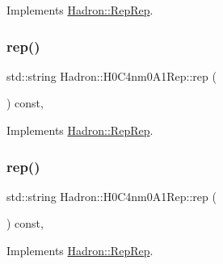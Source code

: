 Implements \mbox{\hyperlink{structHadron_1_1RepRep_ab3213025f6de249f7095892109575fde}{Hadron\+::\+Rep\+Rep}}.

\mbox{\label{structHadron_1_1H0C4nm0A1Rep_a30712f6aadf0e0304142526d08c2822e}} 
\subsubsection{\texorpdfstring{rep()}{rep()}\hspace{0.1cm}{\footnotesize\ttfamily [2/5]}}
{\footnotesize\ttfamily std\+::string Hadron\+::\+H0\+C4nm0\+A1\+Rep\+::rep (\begin{DoxyParamCaption}{ }\end{DoxyParamCaption}) const\hspace{0.3cm}{\ttfamily [inline]}, {\ttfamily [virtual]}}



Implements \mbox{\hyperlink{structHadron_1_1RepRep_ab3213025f6de249f7095892109575fde}{Hadron\+::\+Rep\+Rep}}.

\mbox{\label{structHadron_1_1H0C4nm0A1Rep_a30712f6aadf0e0304142526d08c2822e}} 
\subsubsection{\texorpdfstring{rep()}{rep()}\hspace{0.1cm}{\footnotesize\ttfamily [3/5]}}
{\footnotesize\ttfamily std\+::string Hadron\+::\+H0\+C4nm0\+A1\+Rep\+::rep (\begin{DoxyParamCaption}{ }\end{DoxyParamCaption}) const\hspace{0.3cm}{\ttfamily [inline]}, {\ttfamily [virtual]}}



Implements \mbox{\hyperlink{structHadron_1_1RepRep_ab3213025f6de249f7095892109575fde}{Hadron\+::\+Rep\+Rep}}.

\mbox{\label{structHadron_1_1H0C4nm0A1Rep_a30712f6aadf0e0304142526d08c2822e}} 
